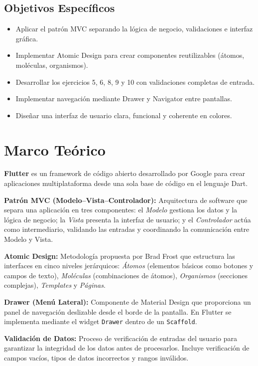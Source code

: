 \documentclass{article}
\begin{document}
\subsection{Objetivos Específicos}
\begin{itemize}[label=\small\color{verdeO}$\blacksquare$]
    \item Aplicar el patrón MVC separando la lógica de negocio, validaciones e interfaz gráfica.
    \item Implementar Atomic Design para crear componentes reutilizables (átomos, moléculas, organismos).
    \item Desarrollar los ejercicios 5, 6, 8, 9 y 10 con validaciones completas de entrada.
    \item Implementar navegación mediante Drawer y Navigator entre pantallas.
    \item Diseñar una interfaz de usuario clara, funcional y coherente en colores.
\end{itemize}

\section{Marco Teórico}

\textbf{Flutter} es un framework de código abierto desarrollado por Google para crear aplicaciones multiplataforma desde una sola base de código en el lenguaje Dart.

\textbf{Patrón MVC (Modelo--Vista--Controlador):} Arquitectura de software que separa una aplicación en tres componentes: el \textit{Modelo} gestiona los datos y la lógica de negocio; la \textit{Vista} presenta la interfaz de usuario; y el \textit{Controlador} actúa como intermediario, validando las entradas y coordinando la comunicación entre Modelo y Vista.

\textbf{Atomic Design:} Metodología propuesta por Brad Frost que estructura las interfaces en cinco niveles jerárquicos: \textit{Átomos} (elementos básicos como botones y campos de texto), \textit{Moléculas} (combinaciones de átomos), \textit{Organismos} (secciones complejas), \textit{Templates} y \textit{Páginas}.

\textbf{Drawer (Menú Lateral):} Componente de Material Design que proporciona un panel de navegación deslizable desde el borde de la pantalla. En Flutter se implementa mediante el widget \texttt{Drawer} dentro de un \texttt{Scaffold}.

\textbf{Validación de Datos:} Proceso de verificación de entradas del usuario para garantizar la integridad de los datos antes de procesarlos. Incluye verificación de campos vacíos, tipos de datos incorrectos y rangos inválidos.
\end{document}

